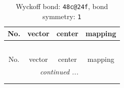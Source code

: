\documentclass[fleqn,8pt]{jsarticle}
\begin{document}
\renewcommand{\arraystretch}{1.2}
\begin{longtable}{cccc}
\caption{Wyckoff bond: {\tt 48c@24f}, bond symmetry: {\tt 1}}
 \\
 \hline \hline
No. & vector & center & mapping \\ \hline \endfirsthead

\multicolumn{3}{l}{\tablename\ \thetable{}} \\
 \hline \hline
No. & vector & center & mapping \\ \hline \endhead

 \hline \hline
\multicolumn{3}{r}{\footnotesize\it continued ...} \\ \endfoot

 \hline \hline
\multicolumn{3}{r}{} \\ \endlastfoot


\end{longtable}
\end{document}
